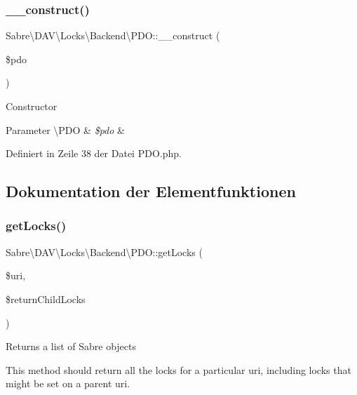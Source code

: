 \subsubsection{\texorpdfstring{\+\_\+\+\_\+construct()}{\_\_construct()}}
{\footnotesize\ttfamily Sabre\textbackslash{}\+D\+A\+V\textbackslash{}\+Locks\textbackslash{}\+Backend\textbackslash{}\+P\+D\+O\+::\+\_\+\+\_\+construct (\begin{DoxyParamCaption}\item[{\textbackslash{}\mbox{\hyperlink{class_sabre_1_1_d_a_v_1_1_locks_1_1_backend_1_1_p_d_o}{P\+DO}}}]{\$pdo }\end{DoxyParamCaption})}

Constructor


\begin{DoxyParams}[1]{Parameter}
\textbackslash{}\+P\+DO & {\em \$pdo} & \\
\hline
\end{DoxyParams}


Definiert in Zeile 38 der Datei P\+D\+O.\+php.



\subsection{Dokumentation der Elementfunktionen}
\mbox{\label{class_sabre_1_1_d_a_v_1_1_locks_1_1_backend_1_1_p_d_o_a990e9ac117f08b7b2f7e4fbc35fb5cd9}} 
\subsubsection{\texorpdfstring{get\+Locks()}{getLocks()}}
{\footnotesize\ttfamily Sabre\textbackslash{}\+D\+A\+V\textbackslash{}\+Locks\textbackslash{}\+Backend\textbackslash{}\+P\+D\+O\+::get\+Locks (\begin{DoxyParamCaption}\item[{}]{\$uri,  }\item[{}]{\$return\+Child\+Locks }\end{DoxyParamCaption})}

Returns a list of Sabre objects

This method should return all the locks for a particular uri, including locks that might be set on a parent uri.

